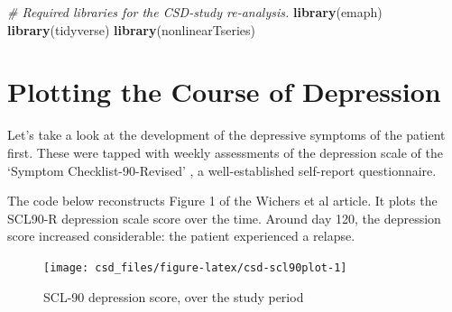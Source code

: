\documentclass[]{book}
\newenvironment{Shaded}{\begin{snugshade}}{\end{snugshade}}
\newcommand{\KeywordTok}[1]{\textcolor[rgb]{0.13,0.29,0.53}{\textbf{#1}}}
\newcommand{\DataTypeTok}[1]{\textcolor[rgb]{0.13,0.29,0.53}{#1}}
\newcommand{\DecValTok}[1]{\textcolor[rgb]{0.00,0.00,0.81}{#1}}
\newcommand{\StringTok}[1]{\textcolor[rgb]{0.31,0.60,0.02}{#1}}
\newcommand{\CommentTok}[1]{\textcolor[rgb]{0.56,0.35,0.01}{\textit{#1}}}
\newcommand{\OperatorTok}[1]{\textcolor[rgb]{0.81,0.36,0.00}{\textbf{#1}}}
\newcommand{\NormalTok}[1]{#1}
\begin{document}
\begin{Shaded}
\begin{Highlighting}[]
\CommentTok{# Required libraries for the CSD-study re-analysis.}
\KeywordTok{library}\NormalTok{(emaph)}
\KeywordTok{library}\NormalTok{(tidyverse)}
\KeywordTok{library}\NormalTok{(nonlinearTseries)}
\end{Highlighting}
\end{Shaded}

\section{Plotting the Course of
Depression}\label{plotting-the-course-of-depression}

Let's take a look at the development of the depressive symptoms of the
patient first. These were tapped with weekly assessments of the
depression scale of the `Symptom Checklist-90-Revised'
\citep[SCL-90-R;][]{Derogatis1994}, a well-established self-report
questionnaire.

The code below reconstructs Figure 1 of the Wichers et al article. It
plots the SCL90-R depression scale score over the time. Around day 120,
the depression score increased considerable: the patient experienced a
relapse.

\begin{Shaded}
\end{Shaded}

\begin{figure}

{\centering \texttt{[image: csd\_files/figure-latex/csd-scl90plot-1]} 

}

\caption{SCL-90 depression score, over the study period}\label{fig:csd-scl90plot}
\end{figure}
\end{document}
